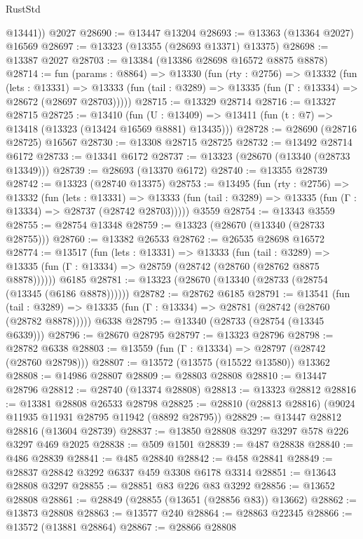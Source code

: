 \begin{lexlean}{RustStd}
\begin{coremodule}
        @13441))
    @2027
@28690 := @13447 @13204
@28693 := @13363 (@13364 @2027) @16569
@28697 := @13323 (@13355 (@28693 @13371) @13375)
@28698 := @13387 @2027
@28703 := @13384 (@13386 @28698 @16572 @8875 @8878)
@28714 := fun (params : @8864) =>
  @13330
    (fun (rty : @2756) =>
    @13332
      (fun (lets : @13331) =>
      @13333 (fun (tail : @3289) => @13335 (fun (Γ : @13334) => @28672 (@28697 @28703)))))
@28715 := @13329 @28714
@28716 := @13327 @28715
@28725 := @13410
    (fun (U : @13409) => @13411 (fun (t : @7) => @13418 (@13323 (@13424 @16569 @8881) @13435)))
@28728 := @28690 (@28716 @28725) @16567
@28730 := @13308 @28715 @28725
@28732 := @13492 @28714 @6172
@28733 := @13341 @6172
@28737 := @13323 (@28670 (@13340 (@28733 @13349)))
@28739 := @28693 (@13370 @6172)
@28740 := @13355 @28739
@28742 := @13323 (@28740 @13375)
@28753 := @13495
    (fun (rty : @2756) =>
    @13332
      (fun (lets : @13331) =>
      @13333 (fun (tail : @3289) => @13335 (fun (Γ : @13334) => @28737 (@28742 @28703)))))
    @3559
@28754 := @13343 @3559
@28755 := @28754 @13348
@28759 := @13323 (@28670 (@13340 (@28733 @28755)))
@28760 := @13382 @26533
@28762 := @26535 @28698 @16572
@28774 := @13517
    (fun (lets : @13331) =>
    @13333
      (fun (tail : @3289) =>
      @13335 (fun (Γ : @13334) => @28759 (@28742 (@28760 (@28762 @8875 @8878))))))
    @6185
@28781 := @13323 (@28670 (@13340 (@28733 (@28754 (@13345 (@6186 @8878))))))
@28782 := @28762 @6185
@28791 := @13541
    (fun (tail : @3289) => @13335 (fun (Γ : @13334) => @28781 (@28742 (@28760 (@28782 @8878)))))
    @6338
@28795 := @13340 (@28733 (@28754 (@13345 @6339)))
@28796 := @28670 @28795
@28797 := @13323 @28796
@28798 := @28782 @6338
@28803 := @13559 (fun (Γ : @13334) => @28797 (@28742 (@28760 @28798)))
@28807 := @13572 (@13575 (@15522 @13580)) @13362
@28808 := @14986 @28807
@28809 := @28803 @28808
@28810 := @13447 @28796
@28812 := @28740 (@13374 @28808)
@28813 := @13323 @28812
@28816 := @13381 @28808 @26533 @28798
@28825 := @28810 (@28813 @28816) (@9024 @11935 @11931 @28795 @11942 (@8892 @28795))
@28829 := @13447 @28812 @28816 (@13604 @28739)
@28837 := @13850 @28808 @3297 @3297 @578 @226 @3297 @469 @2025
@28838 := @509 @1501
@28839 := @487 @28838
@28840 := @486 @28839
@28841 := @485 @28840
@28842 := @458 @28841
@28849 := @28837 @28842 @3292 @6337 @459 @3308 @6178 @3314
@28851 := @13643 @28808 @3297
@28855 := @28851 @83 @226 @83 @3292
@28856 := @13652 @28808
@28861 := @28849 (@28855 (@13651 (@28856 @83)) @13662)
@28862 := @13873 @28808
@28863 := @13577 @240
@28864 := @28863 @22345
@28866 := @13572 (@13881 @28864)
@28867 := @28866 @28808

\end{coremodule}
\end{lexlean}
